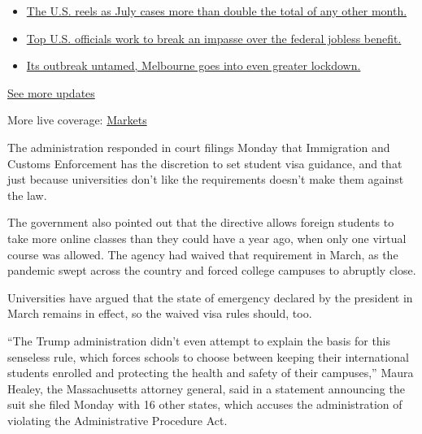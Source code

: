 \begin{itemize}
\tightlist
\item
  \href{https://www.nytimes.com/2020/08/01/world/coronavirus-covid-19.html?action=click\&pgtype=Article\&state=default\&region=MAIN_CONTENT_1\&context=storylines_live_updates\#link-34047410}{The
  U.S. reels as July cases more than double the total of any other
  month.}
\item
  \href{https://www.nytimes.com/2020/08/01/world/coronavirus-covid-19.html?action=click\&pgtype=Article\&state=default\&region=MAIN_CONTENT_1\&context=storylines_live_updates\#link-780ec966}{Top
  U.S. officials work to break an impasse over the federal jobless
  benefit.}
\item
  \href{https://www.nytimes.com/2020/08/01/world/coronavirus-covid-19.html?action=click\&pgtype=Article\&state=default\&region=MAIN_CONTENT_1\&context=storylines_live_updates\#link-2bc8948}{Its
  outbreak untamed, Melbourne goes into even greater lockdown.}
\end{itemize}

\href{https://www.nytimes.com/2020/08/01/world/coronavirus-covid-19.html?action=click\&pgtype=Article\&state=default\&region=MAIN_CONTENT_1\&context=storylines_live_updates}{See
more updates}

More live coverage:
\href{https://www.nytimes.com/live/2020/07/31/business/stock-market-today-coronavirus?action=click\&pgtype=Article\&state=default\&region=MAIN_CONTENT_1\&context=storylines_live_updates}{Markets}

The administration responded in court filings Monday that Immigration
and Customs Enforcement has the discretion to set student visa guidance,
and that just because universities don't like the requirements doesn't
make them against the law.

The government also pointed out that the directive allows foreign
students to take more online classes than they could have a year ago,
when only one virtual course was allowed. The agency had waived that
requirement in March, as the pandemic swept across the country and
forced college campuses to abruptly close.

Universities have argued that the state of emergency declared by the
president in March remains in effect, so the waived visa rules should,
too.

``The Trump administration didn't even attempt to explain the basis for
this senseless rule, which forces schools to choose between keeping
their international students enrolled and protecting the health and
safety of their campuses,'' Maura Healey, the Massachusetts attorney
general, said in a statement announcing the suit she filed Monday with
16 other states, which accuses the administration of violating the
Administrative Procedure Act.

